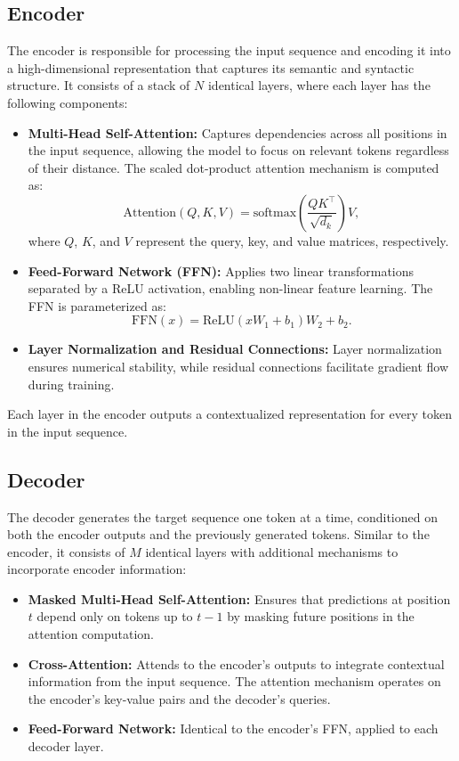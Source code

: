 \documentclass{article}
\begin{document}
\subsection{Encoder}

The encoder is responsible for processing the input sequence and encoding it into a high-dimensional representation that captures its semantic and syntactic structure. It consists of a stack of $N$ identical layers, where each layer has the following components:
\begin{itemize}
    \item \textbf{Multi-Head Self-Attention:} Captures dependencies across all positions in the input sequence, allowing the model to focus on relevant tokens regardless of their distance. The scaled dot-product attention mechanism is computed as:
    \[
    \text{Attention}(Q, K, V) = \text{softmax}\left(\frac{QK^\top}{\sqrt{d_k}}\right)V,
    \]
    where $Q$, $K$, and $V$ represent the query, key, and value matrices, respectively.
    \item \textbf{Feed-Forward Network (FFN):} Applies two linear transformations separated by a ReLU activation, enabling non-linear feature learning. The FFN is parameterized as:
    \[
    \text{FFN}(x) = \text{ReLU}(xW_1 + b_1)W_2 + b_2.
    \]
    \item \textbf{Layer Normalization and Residual Connections:} Layer normalization ensures numerical stability, while residual connections facilitate gradient flow during training.
\end{itemize}

Each layer in the encoder outputs a contextualized representation for every token in the input sequence.

\subsection{Decoder}

The decoder generates the target sequence one token at a time, conditioned on both the encoder outputs and the previously generated tokens. Similar to the encoder, it consists of $M$ identical layers with additional mechanisms to incorporate encoder information:
\begin{itemize}
    \item \textbf{Masked Multi-Head Self-Attention:} Ensures that predictions at position $t$ depend only on tokens up to $t-1$ by masking future positions in the attention computation.
    \item \textbf{Cross-Attention:} Attends to the encoder's outputs to integrate contextual information from the input sequence. The attention mechanism operates on the encoder's key-value pairs and the decoder's queries.
    \item \textbf{Feed-Forward Network:} Identical to the encoder's FFN, applied to each decoder layer.
\end{itemize}
\end{document}
